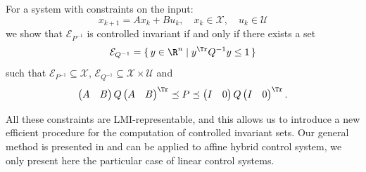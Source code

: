 \documentclass{blux}
\begin{document}
For a system with constraints on the input:
\[ x_{k+1} = A x_k + B u_k, \quad x_k \in \mathcal{X}, \quad u_k \in \mathcal{U} \]
we show that $\mathcal{E}_{P^{-1}}$ is controlled invariant if and only if
there exists a set
\[ \mathcal{E}_{Q^{-1}} = \{\, y \in \R^n \mid y^\Tr Q^{-1} y \leq 1 \,\} \]
such that $\mathcal{E}_{P^{-1}} \subseteq \mathcal{X}$, $\mathcal{E}_{Q^{-1}} \subseteq \mathcal{X} \times \mathcal{U}$ and
\[
    \begin{pmatrix}
        A & B
    \end{pmatrix}
    Q
    \begin{pmatrix}
        A & B
    \end{pmatrix}^\Tr
    \preceq P \preceq
    \begin{pmatrix}
        I & 0
    \end{pmatrix}
    Q
    \begin{pmatrix}
        I & 0
    \end{pmatrix}^\Tr.
\]


All these constraints are LMI-representable, and this allows us to introduce a new efficient procedure for the computation of controlled invariant sets.
Our general method is presented in \cite{legat2018computing} and can be applied to affine hybrid control system, we only present here the particular case of linear control systems.








\end{document}
